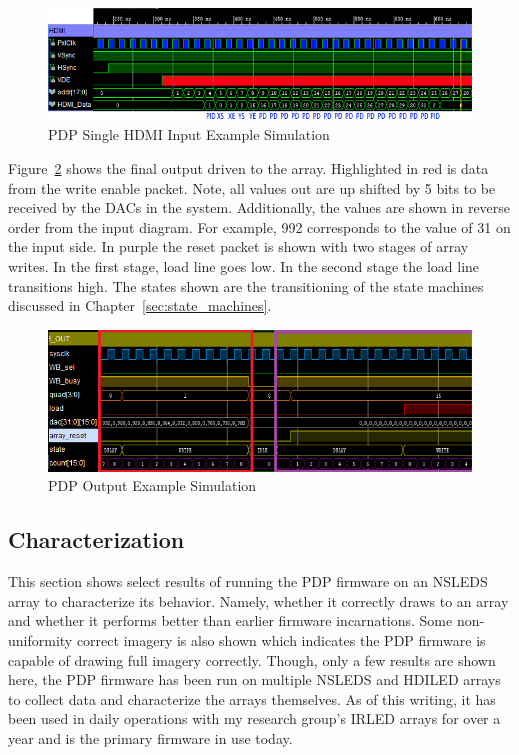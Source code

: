     \begin{figure}
        \centering
        \includegraphics[width=1.0\textwidth]{fig/pdp_input_example.png}
        \caption{PDP Single HDMI Input Example Simulation}
        \label{fig:input_example}
    \end{figure}

    Figure~\ref{fig:output_example} shows the final output driven to the array. Highlighted in red is data from the write enable packet. Note, all values out are up shifted by 5 bits to be received by the DACs in the system. Additionally, the values are shown in reverse order from the input diagram. For example, 992 corresponds to the value of 31 on the input side. In purple the reset packet is shown with two stages of array writes. In the first stage, load line goes low. In the second stage the load line transitions high. The states shown are the transitioning of the state machines discussed in Chapter~\ref{sec:state_machines}.

    \begin{figure}
        \centering
        \includegraphics[width=1.0\textwidth]{fig/pdp_output_example.png}
        \caption{PDP Output Example Simulation}
        \label{fig:output_example}
    \end{figure}

    \subsection{Characterization}
        This section shows select results of running the PDP firmware on an NSLEDS array to characterize its behavior. Namely, whether it correctly draws to an array and whether it performs better than earlier firmware incarnations. Some non-uniformity correct imagery is also shown which indicates the PDP firmware is capable of drawing full imagery correctly. Though, only a few results are shown here, the PDP firmware has been run on multiple NSLEDS and HDILED arrays to collect data and characterize the arrays themselves. As of this writing, it has been used in daily operations with my research group's IRLED arrays for over a year and is the primary firmware in use today.

